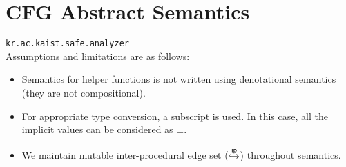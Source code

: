 \chapter{CFG Abstract Semantics}
{\tt kr.ac.kaist.safe.analyzer}\\

Assumptions and limitations are as follows:
\begin{itemize}
    \item Semantics for helper functions is not written using denotational semantics
    (they are not compositional).
    \item For appropriate type conversion, a subscript is used. 
    In this case, all the implicit values can be considered as $\bot$.
    \item We maintain mutable inter-procedural edge set ($\stackrel{\mathsf{ip}}{\hookrightarrow}$) throughout semantics.
\end{itemize}

\newpage
